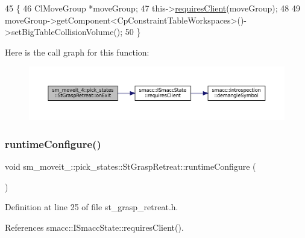 \begin{DoxyCode}
45     \{
46         ClMoveGroup *moveGroup;
47         this->\hyperlink{classsmacc_1_1ISmaccState_a7f95c9f0a6ea2d6f18d1aec0519de4ac}{requiresClient}(moveGroup);
48         
49         moveGroup->getComponent<CpConstraintTableWorkspaces>()->setBigTableCollisionVolume();
50     \}
\end{DoxyCode}
Here is the call graph for this function\+:
\nopagebreak
\begin{figure}[H]
\begin{center}
\leavevmode
\includegraphics[width=350pt]{structsm__moveit__4_1_1pick__states_1_1StGraspRetreat_ae6035a6317e164c80e98220cd860260b_cgraph}
\end{center}
\end{figure}
\mbox{\label{structsm__moveit__4_1_1pick__states_1_1StGraspRetreat_a2d386f511e377a4b0eb8193cd24ddb84}} 
\subsubsection{\texorpdfstring{runtime\+Configure()}{runtimeConfigure()}}
{\footnotesize\ttfamily void sm\+\_\+moveit\+\_\+::pick\+\_\+states\+::\+St\+Grasp\+Retreat\+::runtime\+Configure (\begin{DoxyParamCaption}{ }\end{DoxyParamCaption})\hspace{0.3cm}{\ttfamily [inline]}}



Definition at line 25 of file st\+\_\+grasp\+\_\+retreat.\+h.



References smacc\+::\+I\+Smacc\+State\+::requires\+Client().


